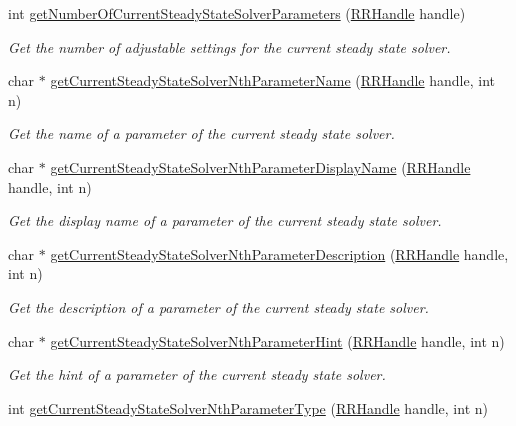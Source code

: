 \begin{DoxyCompactItemize}
int \hyperlink{group__simopts_ga669437dfce773b8fa6f72bd3d26748b0}{get\+Number\+Of\+Current\+Steady\+State\+Solver\+Parameters} (\hyperlink{rrc__types_8h_a1d68f0592372208fa5a5f2799ea4b3ae}{R\+R\+Handle} handle)
\begin{DoxyCompactList}\small\item\em Get the number of adjustable settings for the current steady state solver. \end{DoxyCompactList}\item 
char $\ast$ \hyperlink{group__simopts_gae7bae8b195623a1f170422b4257bc97b}{get\+Current\+Steady\+State\+Solver\+Nth\+Parameter\+Name} (\hyperlink{rrc__types_8h_a1d68f0592372208fa5a5f2799ea4b3ae}{R\+R\+Handle} handle, int n)
\begin{DoxyCompactList}\small\item\em Get the name of a parameter of the current steady state solver. \end{DoxyCompactList}\item 
char $\ast$ \hyperlink{group__simopts_ga26312818edb69cf716ac56a5a065d1d5}{get\+Current\+Steady\+State\+Solver\+Nth\+Parameter\+Display\+Name} (\hyperlink{rrc__types_8h_a1d68f0592372208fa5a5f2799ea4b3ae}{R\+R\+Handle} handle, int n)
\begin{DoxyCompactList}\small\item\em Get the display name of a parameter of the current steady state solver. \end{DoxyCompactList}\item 
char $\ast$ \hyperlink{group__simopts_gae8ec0f65a3425758d77f43ed8ce21ce3}{get\+Current\+Steady\+State\+Solver\+Nth\+Parameter\+Description} (\hyperlink{rrc__types_8h_a1d68f0592372208fa5a5f2799ea4b3ae}{R\+R\+Handle} handle, int n)
\begin{DoxyCompactList}\small\item\em Get the description of a parameter of the current steady state solver. \end{DoxyCompactList}\item 
char $\ast$ \hyperlink{group__simopts_gae77505cd72c88e472c6e6b8f967aa263}{get\+Current\+Steady\+State\+Solver\+Nth\+Parameter\+Hint} (\hyperlink{rrc__types_8h_a1d68f0592372208fa5a5f2799ea4b3ae}{R\+R\+Handle} handle, int n)
\begin{DoxyCompactList}\small\item\em Get the hint of a parameter of the current steady state solver. \end{DoxyCompactList}\item 
int \hyperlink{group__simopts_ga77dcaf609de8b7c9ff829e26f02695b0}{get\+Current\+Steady\+State\+Solver\+Nth\+Parameter\+Type} (\hyperlink{rrc__types_8h_a1d68f0592372208fa5a5f2799ea4b3ae}{R\+R\+Handle} handle, int n)

\end{DoxyCompactItemize}
